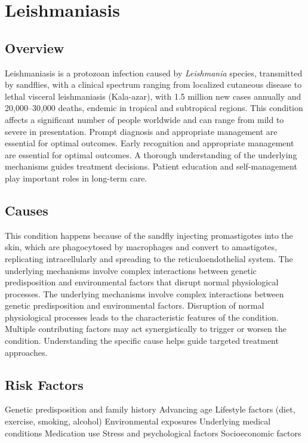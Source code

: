\chapter{Leishmaniasis}
\label{sec:Leishmaniasis}

\section{Overview}
Leishmaniasis is a protozoan infection caused by \textit{Leishmania} species, transmitted by sandflies, with a clinical spectrum ranging from localized cutaneous disease to lethal visceral leishmaniasis (Kala-azar), with 1.5 million new cases annually and 20,000--30,000 deaths, endemic in tropical and subtropical regions. This condition affects a significant number of people worldwide and can range from mild to severe in presentation. Prompt diagnosis and appropriate management are essential for optimal outcomes. Early recognition and appropriate management are essential for optimal outcomes. A thorough understanding of the underlying mechanisms guides treatment decisions. Patient education and self-management play important roles in long-term care.
\section{Causes}
This condition happens because of the sandfly injecting promastigotes into the skin, which are phagocytosed by macrophages and convert to amastigotes, replicating intracellularly and spreading to the reticuloendothelial system. The underlying mechanisms involve complex interactions between genetic predisposition and environmental factors that disrupt normal physiological processes. The underlying mechanisms involve complex interactions between genetic predisposition and environmental factors. Disruption of normal physiological processes leads to the characteristic features of the condition. Multiple contributing factors may act synergistically to trigger or worsen the condition. Understanding the specific cause helps guide targeted treatment approaches.
\section{Risk Factors}
Genetic predisposition and family history Advancing age Lifestyle factors (diet, exercise, smoking, alcohol) Environmental exposures Underlying medical conditions Medication use Stress and psychological factors Socioeconomic factors

